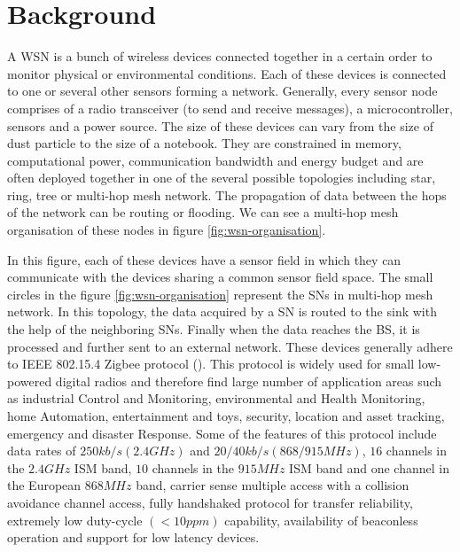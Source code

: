 
\chapter{Background}\label{ch:Background}

A \ac{WSN} is a bunch of wireless devices connected together in a certain order to monitor physical or environmental conditions. Each of these devices is connected to one or several other sensors forming a network. Generally, every sensor node comprises of a radio transceiver (to send and receive messages), a microcontroller, sensors and a power source. The size of these devices can vary from the size of dust particle to the size of a notebook. They are constrained in memory, computational power, communication bandwidth and energy budget and are often deployed together in one of the several possible topologies including star, ring, tree or multi-hop mesh network. The propagation of data between the hops of the network can be routing or flooding. We can see a multi-hop mesh organisation of these nodes in figure \ref{fig:wsn-organisation}.

\par
In this figure, each of these devices have a sensor field in which they can communicate with the devices sharing a common sensor field space. The small circles in the figure \ref{fig:wsn-organisation} represent the \acp{SN} in multi-hop mesh network. In this topology, the data acquired by a \ac{SN} is routed to the sink with the help of the neighboring \acp{SN}. Finally when the data reaches the \ac{BS}, it is processed and further sent to an external network. These devices generally adhere to IEEE 802.15.4 Zigbee protocol (\cite{ieee:802.15.4}). This protocol is widely used for small low-powered digital radios and therefore find large number of application areas such as industrial Control and Monitoring, environmental and Health Monitoring, home Automation, entertainment and toys, security, location and asset tracking, emergency and disaster Response. Some of the features of this protocol include data rates of $250 kb/s (2.4 GHz)$ and $20/40 kb/s (868/915 MHz)$, $16$ channels in the $2.4 GHz$ ISM band, $10$ channels in the $915 MHz$ ISM band and one channel in the European $868 MHz$ band, carrier sense multiple access with a collision avoidance channel access, fully handshaked protocol for transfer reliability, extremely low duty-cycle $(< 10 ppm)$ capability, availability of beaconless operation and support for low latency devices.


